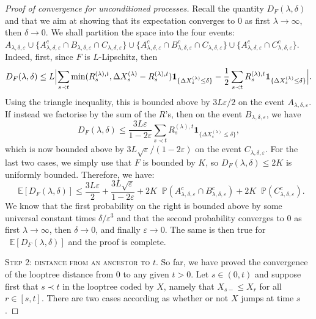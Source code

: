 \documentclass[british, a4paper,11pt]{article}
\numberwithin{equation}{section}
\theoremstyle{definition}
\renewcommand{\P}{\mathop{}\!\mathbb{P}}
\newcommand{\E}{\mathop{}\!\mathbb{E}}
\newcommand{\ind}[1]{\mathbf{1}_{\{#1\}}}
\begin{document}
\begin{proof}[Proof of convergence for unconditioned processes]
Recall the quantity $D_F(\lambda, \delta)$ and that we aim at showing that its expectation converges to $0$ as first $\lambda\to\infty$, then $\delta\to0$.
We shall partition the space into the four events: 
$A_{\lambda, \delta, \varepsilon} 
\cup \{A_{\lambda, \delta, \varepsilon}^c \cap B_{\lambda, \delta, \varepsilon} \cap C_{\lambda, \delta, \varepsilon}\} 
\cup \{A_{\lambda, \delta, \varepsilon}^c \cap B_{\lambda, \delta, \varepsilon}^c \cap C_{\lambda, \delta, \varepsilon}\} 
\cup \{A_{\lambda, \delta, \varepsilon}^c \cap C_{\lambda, \delta, \varepsilon}^c\} 
$.
Indeed, first, since $F$ is $L$-Lipschitz, then 
\[D_F(\lambda, \delta)
\le L \Bigl|\sum_{s \prec t} \min(R^{(\lambda), t}_s, \Delta X^{(\lambda)}_s-R^{(\lambda), t}_s) \ind{\Delta X^{(\lambda)}_s \leq \delta} - \frac{1}{2} \sum_{s \prec t} R^{(\lambda), t}_s \ind{\Delta X^{(\lambda)}_s \leq \delta}\Bigr|
.\]
Using the triangle inequality, this is bounded above by $3 L \varepsilon / 2$ on the event $A_{\lambda, \delta, \varepsilon}$.
If instead we factorise by the sum of the $R$'s, then on the event $B_{\lambda, \delta, \varepsilon}$, we have
\[D_F(\lambda, \delta)
\le \frac{3L \varepsilon}{1-2\varepsilon} \sum_{s \prec t} R^{(\lambda), t}_s \ind{\Delta X^{(\lambda)}_s \leq \delta}
,\]
which is now bounded above by $3L \sqrt{\varepsilon} / (1-2\varepsilon)$ on the event $C_{\lambda, \delta, \varepsilon}$.
For the last two cases, we simply use that $F$ is bounded by $K$, so $D_F(\lambda, \delta) \le 2K$ is uniformly bounded.
Therefore, we have:
\[\E[D_F(\lambda, \delta)]
\le \frac{3 L \varepsilon}{2} + \frac{3L \sqrt{\varepsilon}}{1-2\varepsilon} + 2K \P(A_{\lambda, \delta, \varepsilon}^c \cap B_{\lambda, \delta, \varepsilon}^c) + 2K \P(C_{\lambda, \delta, \varepsilon}^c).\]
We know that the first probability on the right is bounded above by some universal constant times $\delta / \varepsilon^3$ and that the second probability converges to $0$ as first $\lambda\to\infty$, then $\delta\to0$, and finally $\varepsilon\to0$. The same is then true for $\E[D_F(\lambda, \delta)]$ and the proof is complete.


\textsc{Step 2: distance from an ancestor to $t$.}
So far, we have proved the convergence of the looptree distance from $0$ to any given $t>0$. Let $s \in (0,t)$ and suppose first that $s \prec t$ in the looptree coded by $X$, namely that $X_{s-} \leq X_r$ for all $r \in [s,t]$. 
There are two cases according as whether or not $X$ jumps at time $s$.


\end{proof}
\end{document}

